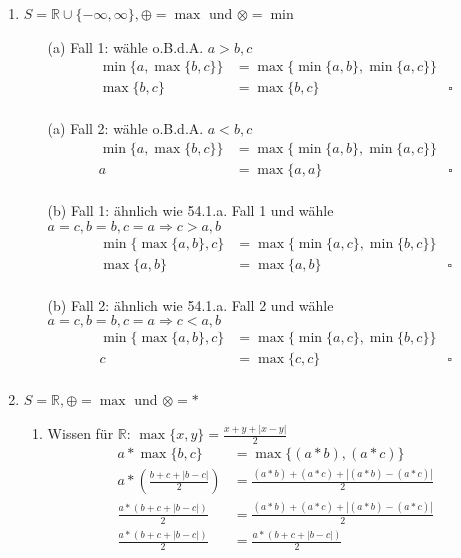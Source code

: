\documentclass[ngerman,a4paper]{report}
\begin{document}
\begin{enumerate}
\item $S=\mathbb{R} \cup \{-\infty,\infty \}, \oplus = \max$ und $\otimes = \min$\\
\begin{enumerate}
\item[(a) Fall 1:] wähle o.B.d.A. $a > b,c$\begin{align*}
\min\{ a, \max\{b, c \} \} &= \max\{ \min\{ a, b\}, \min\{ a, c\} \}\\
\max\{b, c \} &= \max\{ b, c \} &\square\\
\end{align*}
\item[(a) Fall 2:] wähle o.B.d.A. $a < b,c $\begin{align*}
\min\{ a, \max\{b, c \} \} &= \max\{ \min\{ a, b\}, \min\{ a, c\} \}\\
a &= \max\{ a,a \} &\square\\
\end{align*}
\item[(b) Fall 1:] ähnlich wie 54.1.a. Fall 1 und wähle $a=c, b = b, c = a \Rightarrow c > a,b$
\begin{align*}
\min\{\max\{a, b\}, c\} &= \max\{ \min\{a,  c\}, \min\{b, c\} \}\\
\max\{a, b\} &= \max\{ a,b \} &\square\\
\end{align*}
\item[(b) Fall 2:] ähnlich wie 54.1.a. Fall 2 und wähle $a=c, b = b, c = a \Rightarrow c < a,b$
\begin{align*}
\min\{\max\{a, b\}, c\} &= \max\{ \min\{a,  c\}, \min\{b, c\} \}\\
c &= \max\{ c,c \} &\square\\
\end{align*}
\end{enumerate}
\item $S=\mathbb{R}, \oplus = \max$ und $\otimes = *$
\begin{enumerate}
\item Wissen für $\mathbb{R}$: $\max\{x,y\} = \frac{x+y + |x-y|}{2}$\begin{align*}
a * \max\{b, c\}&= \max\{(a * b), (a * c) \}\\
a * (\frac{b + c + |b-c|}{2}) &= \frac{(a*b) + (a*c) + |(a*b) - (a*c)|}{2}\\
\frac{a * (b + c + |b-c|)}{2} &= \frac{(a*b) + (a*c) + |(a*b) - (a*c)|}{2}\\
\frac{a * (b + c + |b-c|)}{2} &= \frac{a * (b + c + |b-c|)}{2}\\

\end{align*}
\end{enumerate}
\end{enumerate}
\end{document}
